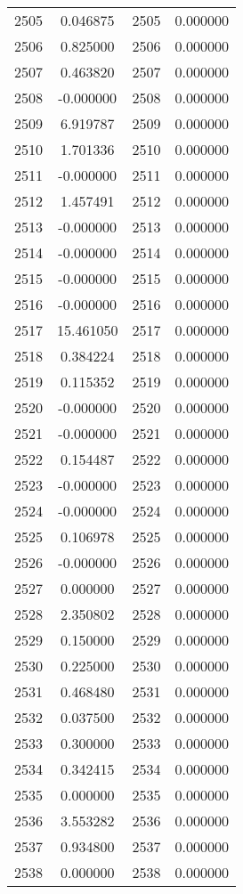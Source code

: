 \documentclass[12pt]{article}
\begin{document}
\begin{longtable}{@{}cccc@{}}
2505 & 0.046875 & 2505 & 0.000000 \\
2506 & 0.825000 & 2506 & 0.000000 \\
2507 & 0.463820 & 2507 & 0.000000 \\
2508 & -0.000000 & 2508 & 0.000000 \\
2509 & 6.919787 & 2509 & 0.000000 \\
2510 & 1.701336 & 2510 & 0.000000 \\
2511 & -0.000000 & 2511 & 0.000000 \\
2512 & 1.457491 & 2512 & 0.000000 \\
2513 & -0.000000 & 2513 & 0.000000 \\
2514 & -0.000000 & 2514 & 0.000000 \\
2515 & -0.000000 & 2515 & 0.000000 \\
2516 & -0.000000 & 2516 & 0.000000 \\
2517 & 15.461050 & 2517 & 0.000000 \\
2518 & 0.384224 & 2518 & 0.000000 \\
2519 & 0.115352 & 2519 & 0.000000 \\
2520 & -0.000000 & 2520 & 0.000000 \\
2521 & -0.000000 & 2521 & 0.000000 \\
2522 & 0.154487 & 2522 & 0.000000 \\
2523 & -0.000000 & 2523 & 0.000000 \\
2524 & -0.000000 & 2524 & 0.000000 \\
2525 & 0.106978 & 2525 & 0.000000 \\
2526 & -0.000000 & 2526 & 0.000000 \\
2527 & 0.000000 & 2527 & 0.000000 \\
2528 & 2.350802 & 2528 & 0.000000 \\
2529 & 0.150000 & 2529 & 0.000000 \\
2530 & 0.225000 & 2530 & 0.000000 \\
2531 & 0.468480 & 2531 & 0.000000 \\
2532 & 0.037500 & 2532 & 0.000000 \\
2533 & 0.300000 & 2533 & 0.000000 \\
2534 & 0.342415 & 2534 & 0.000000 \\
2535 & 0.000000 & 2535 & 0.000000 \\
2536 & 3.553282 & 2536 & 0.000000 \\
2537 & 0.934800 & 2537 & 0.000000 \\
2538 & 0.000000 & 2538 & 0.000000 \\

\end{longtable}
\end{document}
